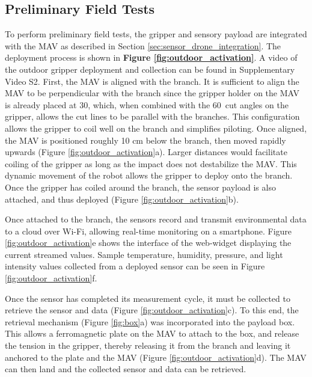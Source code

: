 \subsection{Preliminary Field Tests}

To perform preliminary field tests, the gripper and sensory payload are integrated with the MAV as described in Section \ref{sec:sensor_drone_integration}. The deployment process is shown in \textbf{Figure \ref{fig:outdoor_activation}}. A video of the outdoor gripper deployment and collection can be found in Supplementary Video S2.  First, the MAV is aligned with the branch. It is sufficient to align the MAV to be perpendicular with the branch since the gripper holder on the MAV is already placed at 30\degree, which, when combined with the 60\degree\ cut angles on the gripper, allows the cut lines to be parallel with the branches. This configuration allows the gripper to coil well on the branch and simplifies piloting. Once aligned, the MAV is positioned roughly 10 cm below the branch, then moved rapidly upwards (Figure \ref{fig:outdoor_activation}a). Larger distances would facilitate coiling of the gripper as long as the impact does not destabilize the MAV. This dynamic movement of the robot allows the gripper to deploy onto the branch. Once the gripper has coiled around the branch, the sensor payload is also attached, and thus deployed (Figure \ref{fig:outdoor_activation}b).

Once attached to the branch, the sensors record and transmit environmental data to a cloud over Wi-Fi, allowing real-time monitoring on a smartphone. Figure \ref{fig:outdoor_activation}e shows the interface of the web-widget displaying the current streamed values. Sample temperature, humidity, pressure, and light intensity values collected from a deployed sensor can be seen in Figure \ref{fig:outdoor_activation}f.

Once the sensor has completed its measurement cycle, it must be collected to retrieve the sensor and data (Figure \ref{fig:outdoor_activation}c). To this end, the retrieval mechanism (Figure \ref{fig:box}a) was incorporated into the payload box. This allows a ferromagnetic plate on the MAV to attach to the box, and release the tension in the gripper, thereby releasing it from the branch and leaving it anchored to the plate and the MAV (Figure \ref{fig:outdoor_activation}d). The MAV can then land and the collected sensor and data can be retrieved.

